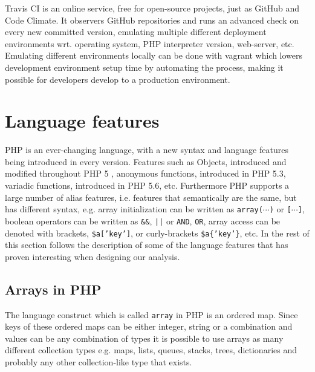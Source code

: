 Travis CI is an online service, free for open-source projects, just as GitHub and Code Climate. It observers GitHub repositories and runs an advanced check on every new committed version, emulating multiple different deployment environments wrt. operating system, PHP interpreter version, web-server, etc. Emulating different environments locally can be done with vagrant which lowers development environment setup time by automating the process, making it possible for developers develop to a production environment.


\section{Language features}
PHP is an ever-changing language, with a new syntax and language features being introduced in every version. Features such as Objects, introduced and modified throughout PHP 5 , anonymous functions, introduced in PHP 5.3, variadic functions, introduced in PHP 5.6, etc. Furthermore PHP supports a large number of alias features, i.e. features that semantically are the same, but has different syntax, e.g. array initialization can be written as \texttt{array($\cdots$)} or \texttt{[$\cdots$]}, boolean operators can be written as \texttt{\&\&}, \texttt{||} or \texttt{AND}, \texttt{OR}, array access can be denoted with brackets, \texttt{\$a['key']}, or curly-brackets \texttt{\$a\{'key'\}}, etc. In the rest of this section follows the description of some of the language features that has proven interesting when designing our analysis.

\subsection{Arrays in PHP}
The language construct which is called \texttt{array} in PHP is an ordered map. Since keys of these ordered maps can be either integer, string or a combination and values can be any combination of types it is possible to use arrays as many different collection types e.g. maps, lists, queues, stacks, trees, dictionaries and probably any other collection-like type that exists.

